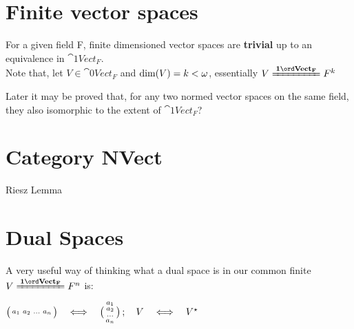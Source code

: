 \section{Finite vector spaces}
For a given field F, finite dimensioned vector spaces are \textbf{trivial} up to an equivalence in \(\cat{1}{Vect_F}\). \\
Note that, let \( V \in \cat{0}{Vect_F} \) and \(\operatorname{dim}(V)=k<\omega \), essentially \(V \iso{Vect_F} F^k \)

Later it may be proved that, for any two normed vector spaces on the same field, they also isomorphic to the extent of \(\cat{1}{Vect_F}\)?

\section{Category NVect}
Riesz Lemma

\section{Dual Spaces}
A very useful way of thinking what a dual space is in our common finite \(V\iso{Vect_F} F^n\) is:
\begin{lemma}
  \(\big(\begin{smallmatrix}
    a_1 & a_2 & \ldots & a_n 
  \end{smallmatrix}\big) \quad \Longleftrightarrow \quad \big(\begin{smallmatrix}
                                         a_1\\
                                         a_2\\
                                         \ldots\\
                                         a_n
                                       \end{smallmatrix}\big)\, ; \quad V \quad \Longleftrightarrow \quad V^{\star}\)
\end{lemma}